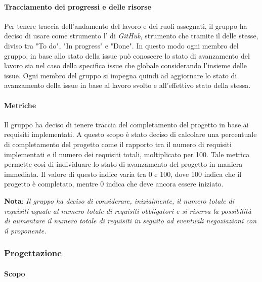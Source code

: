 \paragraph{Tracciamento dei progressi e delle risorse}
Per tenere traccia dell'andamento del lavoro e dei ruoli assegnati, il gruppo ha deciso di usare come strumento
l' di \emph{GitHub}, strumento che tramite il  delle
 stesse, diviso tra "To do", "In progress" e "Done". In questo modo ogni membro del gruppo, in
base allo stato della issue può conoscere lo stato di avanzamento del lavoro sia nel caso della specifica issue
che globale considerando l'insieme delle issue. Ogni membro del gruppo si impegna quindi ad aggiornare lo stato
di avanzamento della issue in base al lavoro svolto e all'effettivo stato della stessa.

\paragraph{Metriche}

Il gruppo ha deciso di tenere traccia del completamento del progetto in base ai requisiti implementati. A questo scopo è
stato deciso di calcolare una percentuale di completamento del progetto come il rapporto tra il numero di requisiti
implementati e il numero dei requisiti totali, moltiplicato per 100. Tale metrica permette così di individuare lo stato
di avanzamento del progetto in maniera immediata. Il valore di questo indice varia tra 0 e 100, dove 100 indica che il
progetto è completato, mentre 0 indica che deve ancora essere iniziato.
\begin{center}
    \textbf{Nota}: \emph{Il gruppo ha deciso di considerare, inizialmente, il numero totale di requisiti uguale al numero totale di requisiti obbligatori e si riserva la
    possibilità di aumentare il numero totale di requisiti in seguito ad eventuali negoziazioni con il proponente.}
\end{center}

\subsubsection{Progettazione}

\paragraph{Scopo}

